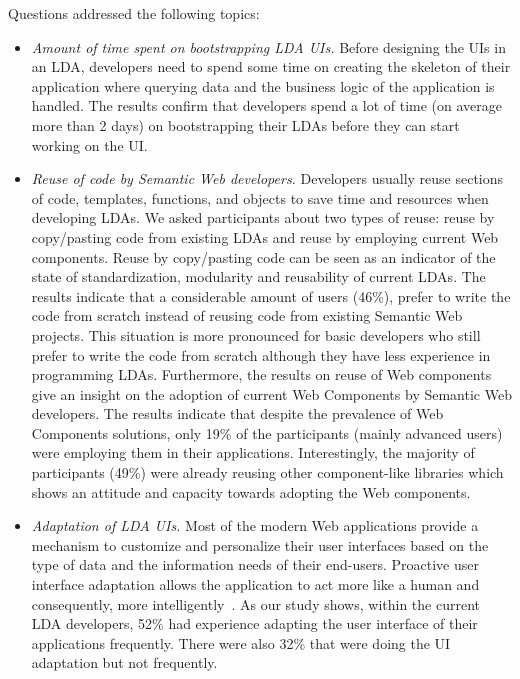 \documentclass{llncs}
\begin{document}
Questions addressed the following topics:
\begin{itemize}

\item
\emph{Amount of time spent on bootstrapping LDA UIs.}
Before designing the UIs in an LDA, developers need to spend some time on creating the skeleton of their application where querying data and the business logic of the application is handled.
The results confirm that developers spend a lot of time (on average more than 2 days) on bootstrapping their LDAs before they can start working on the UI.

\item
\emph{Reuse of code by Semantic Web developers.}
Developers usually reuse sections of code, templates, functions, and objects to save time and resources when developing LDAs.
We asked participants about two types of reuse: reuse by copy/pasting code from existing LDAs and reuse by employing current Web components.
Reuse by copy/pasting code can be seen as an indicator of the state of standardization, modularity and reusability of current LDAs.
The results indicate that a considerable amount of users (46\%), prefer to write the code from scratch instead of reusing code from existing Semantic Web projects.
This situation is more pronounced for basic developers who still prefer to write the code from scratch although they have less experience in programming LDAs.
Furthermore, the results on reuse of Web components give an insight on the adoption of current Web Components by Semantic Web developers.
The results indicate that despite the prevalence of Web Components solutions, only 19\% of the participants (mainly advanced users) were employing them in their applications.
Interestingly, the majority of participants (49\%) were already reusing other component-like libraries which shows an attitude and capacity towards adopting the Web components.

\item
\emph{Adaptation of LDA UIs.}
Most of the modern Web applications provide a mechanism to customize and personalize their user interfaces based on the type of data and the information needs of their end-users.
Proactive user interface adaptation allows the application to act more like a human and consequently, more intelligently~\cite{adaptiveSW2011}.
As our study shows, within the current LDA developers, 52\% had experience adapting the user interface of their applications frequently. There were also 32\% that were doing the UI adaptation but not frequently.


\end{itemize}
\end{document}
